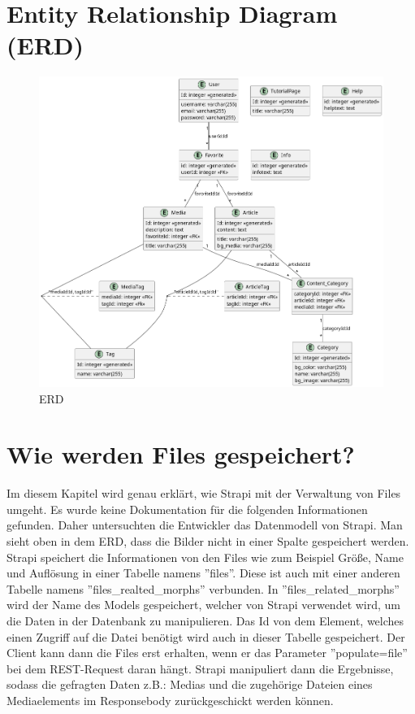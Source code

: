 \section{\textbf{E}ntity \textbf{R}elationship \textbf{D}iagram (ERD)}

\begin{figure}[H]
  \centering
  \includegraphics[height=1\textwidth]{./pics/erd.png}
  \caption{ERD}

\end{figure}

\section{Wie werden Files gespeichert?}
Im diesem Kapitel wird genau erklärt, wie Strapi mit der Verwaltung von Files umgeht. Es wurde keine Dokumentation für die folgenden Informationen gefunden. Daher untersuchten die Entwickler das Datenmodell von  Strapi.
Man sieht oben in dem ERD,
dass die Bilder nicht in einer Spalte gespeichert werden. Strapi speichert die Informationen von den Files wie zum Beispiel Größe, Name und Auflösung in einer Tabelle namens ''files''.
Diese ist auch mit einer anderen Tabelle namens ''files\_realted\_morphs'' verbunden. In ''files\_related\_morphs'' wird der Name des Models gespeichert, welcher von Strapi verwendet wird, um die Daten in der Datenbank zu manipulieren. Das Id von dem Element, welches einen Zugriff auf die Datei benötigt wird auch in dieser Tabelle gespeichert.
Der Client kann dann die Files erst erhalten, wenn er das Parameter ''populate=file'' bei dem REST-Request daran hängt. Strapi manipuliert dann die Ergebnisse, sodass die gefragten Daten z.B.: Medias und die zugehörige Dateien eines Mediaelements im Responsebody zurückgeschickt werden können.

